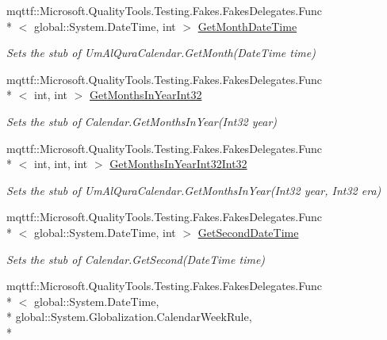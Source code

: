 \begin{DoxyCompactItemize}
mqttf\-::\-Microsoft.\-Quality\-Tools.\-Testing.\-Fakes.\-Fakes\-Delegates.\-Func\\*
$<$ global\-::\-System.\-Date\-Time, int $>$ \hyperlink{class_system_1_1_globalization_1_1_fakes_1_1_stub_um_al_qura_calendar_ac9321cc2dec83b5d0466999cde6ff002}{Get\-Month\-Date\-Time}
\begin{DoxyCompactList}\small\item\em Sets the stub of Um\-Al\-Qura\-Calendar.\-Get\-Month(\-Date\-Time time)\end{DoxyCompactList}\item 
mqttf\-::\-Microsoft.\-Quality\-Tools.\-Testing.\-Fakes.\-Fakes\-Delegates.\-Func\\*
$<$ int, int $>$ \hyperlink{class_system_1_1_globalization_1_1_fakes_1_1_stub_um_al_qura_calendar_a539c9a0ba0950141e83b11a12625633c}{Get\-Months\-In\-Year\-Int32}
\begin{DoxyCompactList}\small\item\em Sets the stub of Calendar.\-Get\-Months\-In\-Year(\-Int32 year)\end{DoxyCompactList}\item 
mqttf\-::\-Microsoft.\-Quality\-Tools.\-Testing.\-Fakes.\-Fakes\-Delegates.\-Func\\*
$<$ int, int, int $>$ \hyperlink{class_system_1_1_globalization_1_1_fakes_1_1_stub_um_al_qura_calendar_acc04dfe55a6ddad61ef44bb57a27c466}{Get\-Months\-In\-Year\-Int32\-Int32}
\begin{DoxyCompactList}\small\item\em Sets the stub of Um\-Al\-Qura\-Calendar.\-Get\-Months\-In\-Year(\-Int32 year, Int32 era)\end{DoxyCompactList}\item 
mqttf\-::\-Microsoft.\-Quality\-Tools.\-Testing.\-Fakes.\-Fakes\-Delegates.\-Func\\*
$<$ global\-::\-System.\-Date\-Time, int $>$ \hyperlink{class_system_1_1_globalization_1_1_fakes_1_1_stub_um_al_qura_calendar_ad80b25a74b06eb288c5d1a305c26cb68}{Get\-Second\-Date\-Time}
\begin{DoxyCompactList}\small\item\em Sets the stub of Calendar.\-Get\-Second(\-Date\-Time time)\end{DoxyCompactList}\item 
mqttf\-::\-Microsoft.\-Quality\-Tools.\-Testing.\-Fakes.\-Fakes\-Delegates.\-Func\\*
$<$ global\-::\-System.\-Date\-Time, \\*
global\-::\-System.\-Globalization.\-Calendar\-Week\-Rule, \\*

\end{DoxyCompactItemize}
